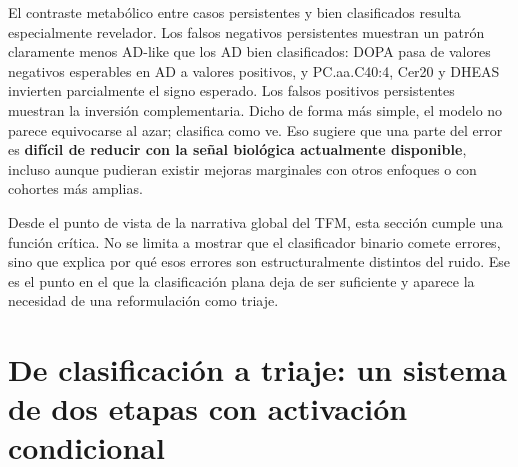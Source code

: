 \begin{table}[ht]
\centering
\caption{Perfiles metabólicos medios de errores persistentes frente a casos bien clasificados (z-scores).}
\label{tab:error_profiles}
\small
\setlength{\tabcolsep}{4pt}
\end{table}

El contraste metabólico entre casos persistentes y bien clasificados resulta especialmente revelador. Los falsos
negativos persistentes muestran un patrón claramente menos AD-like que los AD bien clasificados: DOPA pasa de valores
negativos esperables en AD a valores positivos, y PC.aa.C40:4, Cer20 y DHEAS invierten parcialmente el signo esperado.
Los falsos positivos persistentes muestran la inversión complementaria. Dicho de forma más simple, el modelo no parece
equivocarse al azar; clasifica como ve. Eso sugiere que una parte del error es \textbf{difícil de reducir con la señal
biológica actualmente disponible}, incluso aunque pudieran existir mejoras marginales con otros enfoques o con cohortes
más amplias.

Desde el punto de vista de la narrativa global del TFM, esta sección cumple una función crítica. No se limita a mostrar que el clasificador binario comete errores, sino que explica por qué esos errores son estructuralmente distintos del ruido. Ese es el punto en el que la clasificación plana deja de ser suficiente y aparece la necesidad de una reformulación como triaje.

\section{De clasificación a triaje: un sistema de dos etapas con activación condicional}\label{sec:cascade}

